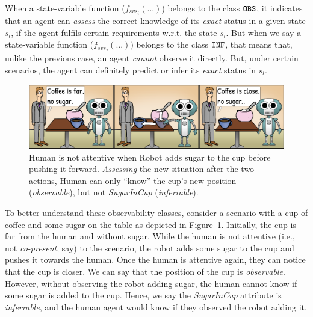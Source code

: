 \documentclass[letterpaper]{article} %
\begin{document}

When a state-variable function ($f_{svs_i}(...)$) belongs to the class $\texttt{OBS}$, it indicates that an agent can \textit{assess} the correct knowledge of its \textit{exact} status in a given state $s_l$, if the agent fulfils certain requirements w.r.t. the state $s_l$. 
But when we say a state-variable function ($f_{svs_j}(...)$) belongs to the class $\texttt{INF}$, that means that, unlike the previous case, an agent \textit{cannot} observe it directly. But, under certain scenarios, the agent can definitely predict or infer its \textit{exact} status in $s_l$. 

\begin{figure}[t!]
    \centering
    \includegraphics[width=0.9\linewidth]{figures/cartoon_inf_obs_bigger.png}
    \caption{
    Human is not attentive when Robot adds sugar to the cup before pushing it forward. \textit{Assessing} the new situation after the two actions, Human can only ``know'' the cup's new position (\textit{observable}), but not \textit{SugarInCup} (\textit{inferrable}).
    }
    \label{fig:obs_attr}
\end{figure}


To better understand these observability classes, consider a scenario with a cup of coffee and some sugar on the table as depicted in Figure~\ref{fig:obs_attr}. 
Initially, the cup is far from the human and without sugar. While the human is not attentive (i.e., not \textit{co-present}, say) to the scenario, the robot adds some sugar to the cup and pushes it towards the human. 
Once the human is attentive again, they
can notice that the cup is closer. We can say that the position of the cup is \textit{observable}.
However, without observing the robot adding sugar, the human cannot know if some sugar is added to the cup. Hence, we say the \textit{SugarInCup} attribute is \textit{inferrable}, 
and the human agent would know if they observed the robot adding it. 
\end{document}
